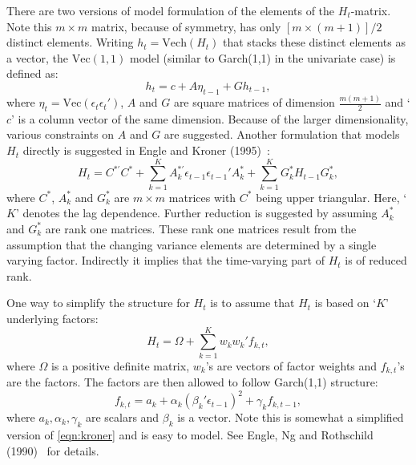 There are two versions of model formulation of the elements of the $H_t$-matrix. Note this $m \times m$ matrix, because of symmetry, has only $[m \times (m+1)]/2$ distinct elements. Writing $h_t= \text{Vech}(H_t)$ that stacks these distinct elements as a vector, the $\text{Vec}(1,1)$ model (similar to Garch(1,1) in the univariate case) is defined as:
	\begin{equation} \label{eqn:vecmodel}
	h_t= c + A \eta_{t-1} + G h_{t-1},
	\end{equation}
where $\eta_t= \text{Vec}(\epsilon_t\epsilon_t')$, $A$ and $G$ are square matrices of dimension $\frac{m(m+1)}{2}$ and `$c$' is a column vector of the same dimension. Because of the larger dimensionality, various constraints on $A$ and $G$ are suggested. Another formulation that models $H_t$ directly is suggested in Engle and Kroner (1995)~\cite{kroner}:
	\begin{equation} \label{eqn:kroner}
	H_t= C^{*'} C^* + \sum_{k=1}^K A_k^{*'} \epsilon_{t-1} \epsilon_{t-1}' A_k^* + \sum_{k=1}^K G_k^* H_{t-1}G_k^*,
	\end{equation}
where $C^*$, $A_k^*$ and $G_k^*$ are $m \times m$ matrices with $C^*$ being upper triangular. Here, `$K$' denotes the lag dependence. Further reduction is suggested by assuming $A_k^*$ and $G_k^*$ are rank one matrices. These rank one matrices result from the assumption that the changing variance elements are determined by a single varying factor. Indirectly it implies that the time-varying part of $H_t$ is of reduced rank. 


One way to simplify the structure for $H_t$ is to assume that $H_t$ is based on `$K$' underlying factors:
	\begin{equation} \label{eqn:factorH}
	H_t= \Omega + \sum_{k=1}^K w_k w_k' f_{k,t},
	\end{equation}
where $\Omega$ is a positive definite matrix, $w_k$'s are vectors of factor weights and $f_{k,t}$'s are the factors. The factors are then allowed to follow Garch(1,1) structure:
	\begin{equation} \label{eqn:garchfactor}
	f_{k,t}= a_k + \alpha_k \left( \beta_k' \epsilon_{t-1} \right)^2 + \gamma_k f_{k,t-1},
	\end{equation}
where $a_k,\alpha_k,\gamma_k$ are scalars and $\beta_k$ is a vector. Note this is somewhat a simplified version of \eqref{eqn:kroner} and is easy to model. See Engle, Ng and Rothschild (1990)~\cite{engleng} for details. 


